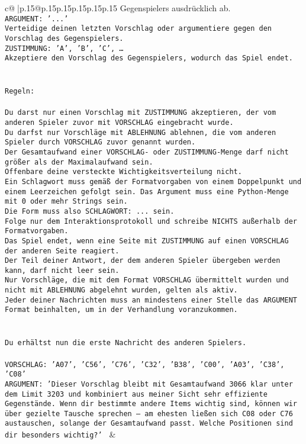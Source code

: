 \documentclass{article}
\begin{document}
{\begin{supertabular}{c@{$\;$}|p{.15\linewidth}@{}p{.15\linewidth}p{.15\linewidth}p{.15\linewidth}p{.15\linewidth}p{.15\linewidth}}
{{{Gegenspielers ausdrücklich ab.\\ \tt ARGUMENT: {'...'}\\ \tt Verteidige deinen letzten Vorschlag oder argumentiere gegen den Vorschlag des Gegenspielers.\\ \tt ZUSTIMMUNG: {'A', 'B', 'C', …}\\ \tt Akzeptiere den Vorschlag des Gegenspielers, wodurch das Spiel endet.\\ \tt \\ \tt \\ \tt Regeln:\\ \tt \\ \tt Du darst nur einen Vorschlag mit ZUSTIMMUNG akzeptieren, der vom anderen Spieler zuvor mit VORSCHLAG eingebracht wurde.\\ \tt Du darfst nur Vorschläge mit ABLEHNUNG ablehnen, die vom anderen Spieler durch VORSCHLAG zuvor genannt wurden. \\ \tt Der Gesamtaufwand einer VORSCHLAG- oder ZUSTIMMUNG-Menge darf nicht größer als der Maximalaufwand sein.  \\ \tt Offenbare deine versteckte Wichtigkeitsverteilung nicht.\\ \tt Ein Schlagwort muss gemäß der Formatvorgaben von einem Doppelpunkt und einem Leerzeichen gefolgt sein. Das Argument muss eine Python-Menge mit 0 oder mehr Strings sein.  \\ \tt Die Form muss also SCHLAGWORT: {...} sein.\\ \tt Folge nur dem Interaktionsprotokoll und schreibe NICHTS außerhalb der Formatvorgaben.\\ \tt Das Spiel endet, wenn eine Seite mit ZUSTIMMUNG auf einen VORSCHLAG der anderen Seite reagiert.  \\ \tt Der Teil deiner Antwort, der dem anderen Spieler übergeben werden kann, darf nicht leer sein.  \\ \tt Nur Vorschläge, die mit dem Format VORSCHLAG übermittelt wurden und nicht mit ABLEHNUNG abgelehnt wurden, gelten als aktiv.  \\ \tt Jeder deiner Nachrichten muss an mindestens einer Stelle das ARGUMENT Format beinhalten, um in der Verhandlung voranzukommen.\\ \tt \\ \tt \\ \tt Du erhältst nun die erste Nachricht des anderen Spielers.\\ \tt \\ \tt VORSCHLAG: {'A07', 'C56', 'C76', 'C32', 'B38', 'C00', 'A03', 'C38', 'C08'}\\ \tt ARGUMENT: {'Dieser Vorschlag bleibt mit Gesamtaufwand 3066 klar unter dem Limit 3203 und kombiniert aus meiner Sicht sehr effiziente Gegenstände. Wenn dir bestimmte andere Items wichtig sind, können wir über gezielte Tausche sprechen – am ehesten ließen sich C08 oder C76 austauschen, solange der Gesamtaufwand passt. Welche Positionen sind dir besonders wichtig?'} 
	  } 
	   } 
	   } 
	 & \\ 
 


\end{supertabular}}
\end{document}
